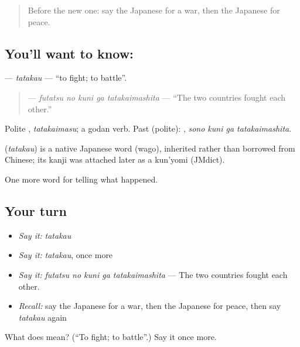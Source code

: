 \begin{quote}
Before the new one: say the Japanese for a war, then the Japanese for peace.
\end{quote}

\subsection*{You'll want to know: }
\textbf{} — \emph{tatakau} — \textquotedblleft{}to fight; to battle\textquotedblright{}.

\begin{quote}
\textbf{  } — \emph{futatsu no kuni ga tatakaimashita} — \textquotedblleft{}The two countries fought each other.\textquotedblright{}
\end{quote}

Polite \textbf{}, \emph{tatakaimasu}; a godan verb. Past (polite): \textbf{  }, \emph{sono kuni ga tatakaimashita}.

\begin{cousinweb}
\textbf{} (\emph{tatakau}) is a native Japanese word (wago), inherited rather than borrowed from Chinese; its kanji was attached later as a kun'yomi (JMdict).
\end{cousinweb}

\begin{grammarlens}[title={What you've built}]
One more word for telling what happened.
\end{grammarlens}

\subsection*{Your turn}
\begin{itemize}
\raggedright
  \item \emph{Say it:} \emph{tatakau}
  \item \emph{Say it:} \emph{tatakau}, once more
  \item \emph{Say it:} \emph{futatsu no kuni ga tatakaimashita} — The two countries fought each other.
  \item \emph{Recall:} say the Japanese for a war, then the Japanese for peace, then say \emph{tatakau} again
\end{itemize}

\begin{tcolorbox}[breakable,colback=teal!4,colframe=teal!35!black,title={Before you move on}]
What does  mean? (\textquotedblleft{}To fight; to battle\textquotedblright{}.) Say it once more.
\end{tcolorbox}
